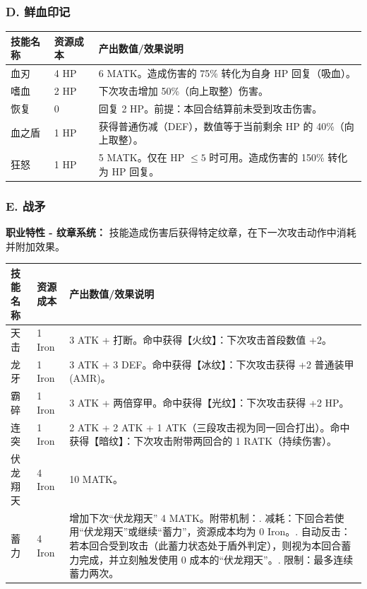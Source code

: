 \documentclass[a4paper,10pt]{ctexart}
\begin{document}
\subsubsection*{D. 鲜血印记}
\begin{table}[h]
\centering
\begin{tabularx}{\textwidth}{llX}
\toprule
技能名称 & 资源成本 & 产出数值/效果说明 \\
\midrule
血刃 & 4 HP & 6 MATK。造成伤害的 75\% 转化为自身 HP 回复（吸血）。 \\
嗜血 & 2 HP & 下次攻击增加 50\%（向上取整）伤害。 \\
恢复 & 0 & 回复 2 HP。前提：本回合结算前未受到攻击伤害。 \\
血之盾 & 1 HP & 获得普通伤减（DEF），数值等于当前剩余 HP 的 40\%（向上取整）。 \\
狂怒 & 1 HP & 5 MATK。仅在 HP $\le 5$ 时可用。造成伤害的 150\% 转化为 HP 回复。 \\
\bottomrule
\end{tabularx}
\end{table}

\subsubsection*{E. 战矛}
\textbf{职业特性 - 纹章系统：} 技能造成伤害后获得特定纹章，在下一次攻击动作中消耗并附加效果。

\begin{table}[h]
\centering
\begin{tabularx}{\textwidth}{llX}
\toprule
技能名称 & 资源成本 & 产出数值/效果说明 \\
\midrule
天击 & 1 Iron & 3 ATK + 打断。命中获得【火纹】：下次攻击首段数值 +2。 \\
龙牙 & 1 Iron & 3 ATK + 3 DEF。命中获得【冰纹】：下次攻击获得 +2 普通装甲(AMR)。 \\
霸碎 & 1 Iron & 3 ATK + 两倍穿甲。命中获得【光纹】：下次攻击获得 +2 HP。 \\
连突 & 1 Iron & 2 ATK + 2 ATK + 1 ATK（三段攻击视为同一回合打出）。命中获得【暗纹】：下次攻击附带两回合的 1 RATK（持续伤害）。 \\
伏龙翔天 & 4 Iron & 10 MATK。 \\
蓄力 & 4 Iron & 增加下次“伏龙翔天” 4 MATK。附带机制：\newline 1. 减耗：下回合若使用“伏龙翔天”或继续“蓄力”，资源成本均为 0 Iron。\newline 2. 自动反击：若本回合受到攻击（此蓄力状态处于盾外判定），则视为本回合蓄力完成，并立刻触发使用 0 成本的“伏龙翔天”。\newline 3. 限制：最多连续蓄力两次。 \\
\bottomrule
\end{tabularx}
\end{table}
\end{document}
